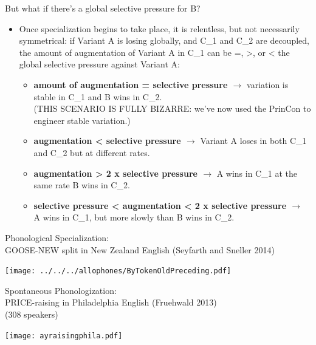 \documentclass[hyperref={pdfpagelabels=false}]{beamer}
\begin{document}
\begin{frame}{But what if there's a global selective pressure for B?}
		\begin{itemize}
			\item Once specialization begins to take place, it is relentless, but not necessarily symmetrical: if Variant A is losing globally, and C_1 and C_2 are decoupled, the amount of augmentation of Variant A in C_1 can be =, >, or < the global selective pressure against Variant A:			
			\begin{itemize}
					\item \textbf{amount of augmentation = selective pressure $\rightarrow$} variation is stable in C_1 and B wins in C_2.\\(THIS SCENARIO IS FULLY BIZARRE: we've now used the PrinCon to engineer stable variation.)
					\item \textbf{augmentation < selective pressure $\rightarrow$} Variant A loses in both C_1 and C_2 but at different rates.
					\item \textbf{augmentation > 2 x selective pressure $\rightarrow$} A wins in C_1 at the same rate B wins in C_2.
					\item \textbf{selective pressure < augmentation < 2 x selective pressure $\rightarrow$} A wins in C_1, but more slowly than B wins in C_2.			
			\end{itemize}
		\end{itemize}
\end{frame}






\begin{frame}{Phonological Specialization: \\ \small{GOOSE-NEW split in New Zealand English (Seyfarth and Sneller 2014)}}

\begin{center}
\texttt{[image: ../../../allophones/ByTokenOldPreceding.pdf]}
\end{center}
\end{frame}


\begin{frame}{Spontaneous Phonologization: \\ \small{PRICE-raising in Philadelphia English (Fruehwald 2013)\\(308 speakers)}}

	
\texttt{[image: ayraisingphila.pdf]}

\end{frame}
\end{document}
